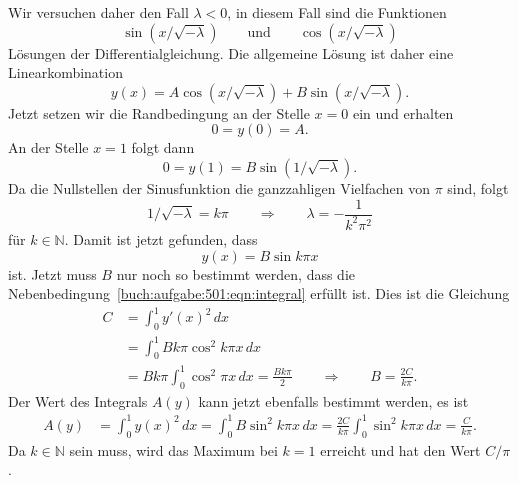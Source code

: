 \begin{loesung}
Wir versuchen daher den Fall $\lambda<0$, in diesem Fall sind die
Funktionen
\[
\sin(x/\!\sqrt{-\lambda})
\qquad\text{und}\qquad
\cos(x/\!\sqrt{-\lambda})
\]
Lösungen der Differentialgleichung.
Die allgemeine Lösung ist daher eine Linearkombination
\[
y(x)
=
A \cos(x/\!\sqrt{-\lambda})
+
B \sin(x/\!\sqrt{-\lambda}).
\]
Jetzt setzen wir die Randbedingung an der Stelle $x=0$ ein und erhalten
\[
0
=
y(0)
=
A.
\]
An der Stelle $x=1$ folgt dann
\[
0=y(1)
=
B\sin(1/\!\sqrt{-\lambda}).
\]
Da die Nullstellen der Sinusfunktion die ganzzahligen Vielfachen von $\pi$
sind, folgt
\[
1/\!\sqrt{-\lambda} = k\pi
\qquad\Rightarrow\qquad
\lambda = -\frac{1}{k^2\pi^2}
\]
für $k\in\mathbb{N}$.
Damit ist jetzt gefunden, dass
\[
y(x) = B \sin k\pi x
\]
ist.
Jetzt muss $B$ nur noch so bestimmt werden, dass die
Nebenbedingung~\eqref{buch:aufgabe:501:eqn:integral} erfüllt ist.
Dies ist die Gleichung
\begin{align*}
C
&=
\int_0^1 y'(x)^2\,dx
\\
&=
\int_0^1 B k\pi \cos^2 k\pi x\,dx
\\
&=
Bk\pi \int_0^1 \cos^2 \pi x\,dx
=
\frac{Bk\pi}2
\qquad
\Rightarrow
\qquad
B
=
\frac{2C}{k\pi}.
\end{align*}
Der Wert des Integrals $A(y)$ kann jetzt ebenfalls bestimmt werden, es
ist
\begin{align*}
A(y)
&=
\int_0^1 y(x)^2\,dx
=
\int_0^1 B\sin^2 k\pi x\,dx
=
\frac{2C}{k\pi} \int_0^1 \sin^2k\pi x\,dx
=
\frac{C}{k\pi}.
\end{align*}
Da $k\in\mathbb{N}$ sein muss, wird das Maximum bei $k=1$ erreicht und
hat den Wert $C/\pi$.
\end{loesung}
